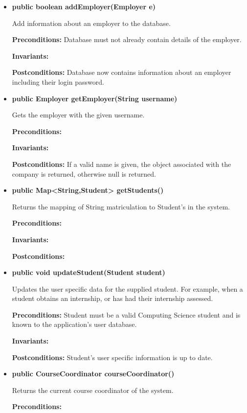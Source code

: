 \documentclass[11pt]{l3deliverable}
\begin{document}
\begin{itemize}

\item{\textbf{public boolean addEmployer(Employer e)}

Add information about an employer to the database.

\textbf{Preconditions:} Database must not already contain details of the 
employer.

\textbf{Invariants:}

\textbf{Postconditions:} Database now contains information about an employer 
including their login password.}

\item{\textbf{public Employer getEmployer(String username)}

Gets the employer with the given username.

\textbf{Preconditions:}

\textbf{Invariants:}

\textbf{Postconditions:} If a valid name is given, the object associated with
the company is returned, otherwise null is returned.}

\item{\textbf{public Map<String,Student> getStudents()}

Returns the mapping of String matriculation to Student's in the system.

\textbf{Preconditions:}

\textbf{Invariants:}

\textbf{Postconditions:}
}

\item{\textbf{public void updateStudent(Student student)}

Updates the user specific data for the supplied student. For example, when a
student obtains an internship, or has had their internship assessed.

\textbf{Preconditions:} Student must be a valid Computing Science student and
is known to the application's user database.

\textbf{Invariants:}

\textbf{Postconditions:} Student's user specific information is up to
date.}

\item{\textbf{public CourseCoordinator courseCoordinator()}

Returns the current course coordinator of the system.

\textbf{Preconditions:} 

}
\end{itemize}
\end{document}
